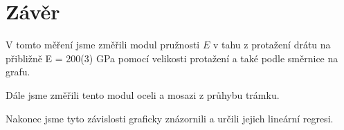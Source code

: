 \section{Závěr}

V tomto měření jsme změřili modul pružnosti \(E\) v tahu z protažení drátu na přibližně E = 200(3) GPa pomocí velikosti protažení a také podle směrnice na grafu.

Dále jsme změřili tento modul oceli a mosazi z průhybu trámku.

Nakonec jsme tyto závislosti graficky znázornili a určili jejich lineární regresi.
